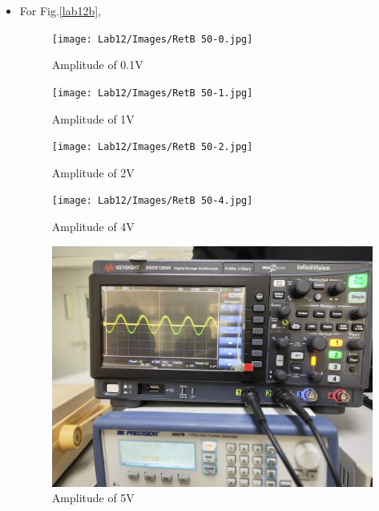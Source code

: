 \begin{itemize}
\begin{itemize}
                    \item For Fig.\ref{lab12b},\\
\begin{figure}[h]
    \centering
    \texttt{[image: Lab12/Images/RetB 50-0.jpg]}
    \caption{Amplitude of 0.1V}
    \label{l120wf}
\end{figure}
\FloatBarrier
\begin{figure}[h]
    \centering
    \texttt{[image: Lab12/Images/RetB 50-1.jpg]}
    \caption{Amplitude of 1V}
    \label{l121wf}
\end{figure}
\FloatBarrier
\begin{figure}[h]
    \centering
    \texttt{[image: Lab12/Images/RetB 50-2.jpg]}
    \caption{Amplitude of 2V}
    \label{l122wf}
\end{figure}
\FloatBarrier
\begin{figure}[h]
    \centering
    \texttt{[image: Lab12/Images/RetB 50-4.jpg]}
    \caption{Amplitude of 4V}
    \label{l124wf}
\end{figure}
\FloatBarrier
\begin{figure}
    \centering
    \includegraphics[width=0.5\linewidth]{Lab12/Images/RetB 50-5.jpg}
    \caption{Amplitude of 5V}
    \label{l125wf}
\end{figure}
\FloatBarrier
                \end{itemize}
\FloatBarrier



\end{itemize}
